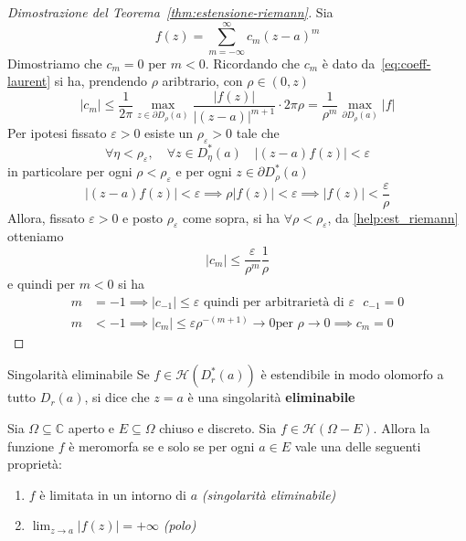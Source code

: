 \begin{proof}[Dimostrazione del Teorema~\ref{thm:estensione-riemann}]
    Sia
\[
    f{(z)} = \sum_{m=-\infty}^{\infty} c_{m} {(z-a)}^{m} 
\]  Dimostriamo che \(c_{m} = 0\) per \(m < 0\). Ricordando che \(c_{m}\) è dato
da~\eqref{eq:coeff-laurent} si ha, prendendo \(\rho\) aribtrario, con \(\rho \in
(0, z)\) 
\begin{equation}\label{help:est_riemann}
    |c_{m}| \le \frac{1}{2\pi} \max_{z \in \partial D_\rho {(a)}}
    \frac{|f{(z)}|}{|{(z-a)}|^{m+1}} \cdot 2\pi \rho =
    \frac{1}{\rho^{m}}\max_{\partial D_\rho{(a)}} |f|
\end{equation}
Per ipotesi fissato \(\varepsilon > 0\) esiste un \(\rho_{\varepsilon} > 0\)
tale che 
\[
    \forall \eta < \rho_\varepsilon, \quad \forall z \in D_\eta^*{(a)} \quad
    |{(z-a)}f{(z)}| < \varepsilon
\]
in particolare per ogni \(\rho < \rho_\varepsilon\) e per ogni \(z \in
\partial D^{*}_\rho {(a)}\) 
\[
    |{(z-a)}f{(z)}| < \varepsilon \implies \rho|f{(z)}| < \varepsilon \implies
    |f{(z)}| < \frac{\varepsilon}{\rho}
\]
Allora, fissato \(\varepsilon>0\) e posto \(\rho_\varepsilon\) come sopra, si ha
\(\forall \rho < \rho_\varepsilon\), da \eqref{help:est_riemann} otteniamo
\[
    |c_m| \le \frac{\varepsilon}{\rho^{m}} \frac{1}{\rho}
\]
e quindi per \(m < 0\) si ha
\begin{align*}
    m &= -1 \implies |c_{-1} | \le \varepsilon \text{ quindi per arbitrarietà di
    \(\varepsilon\) } c_{-1} = 0 \\
        m &< -1 \implies |c_{m}| \le \varepsilon \rho^{-{(m+1)}} \to 0 \text{
        per } \rho \to 0 \implies c_{m} = 0
\end{align*}
\end{proof}
\begin{definition}{Singolarità eliminabile}
    Se \(f \in \mathcal{H}{(D^{*}_r{(a)})}\) è estendibile in modo olomorfo a
    tutto \(D_r{(a)}\), si dice che \(z=a\) è una singolarità
    \textbf{eliminabile}
\end{definition}
\begin{proposition}
    Sia \(\Omega \subseteq \mathbb{C} \) aperto e \(E \subseteq \Omega \) chiuso
    e discreto. Sia \(f \in \mathcal{H}{(\Omega - E)}\). Allora la funzione
    \(f\) è meromorfa se e solo se per ogni \(a \in E\) vale una delle seguenti
    proprietà:
\begin{enumerate}[label = \alph*)]
    \item \(f\) è limitata in un intorno di \(a\) \emph{(singolarità
        eliminabile)}
    \item \(\lim_{z \to a} |f{(z)}| = +\infty\) \emph{(polo)}
\end{enumerate}
\end{proposition}
